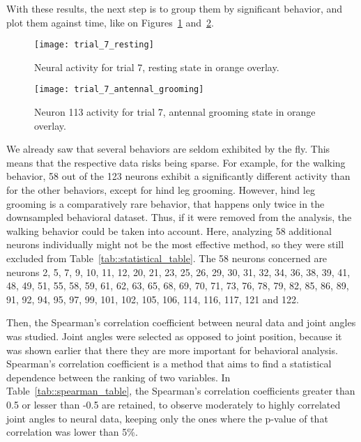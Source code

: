 With these results, the next step is to group them by significant behavior, and plot them against time, like on Figures~\ref{fig::trial_7_resting} and~\ref{fig::trial_7_antennal_grooming}.

\begin{figure}[htbp]
	\begin{center}
		\texttt{[image: trial\_7\_resting]}
	\end{center}
	\caption{Neural activity for trial 7, resting state in orange overlay.}
	\label{fig::trial_7_resting}
\end{figure}

\begin{figure}[htbp]
	\begin{center}
		\texttt{[image: trial\_7\_antennal\_grooming]}
	\end{center}
	\caption{Neuron 113 activity for trial 7, antennal grooming state in orange overlay.}
	\label{fig::trial_7_antennal_grooming}
\end{figure}

We already saw that several behaviors are seldom exhibited by the fly.
This means that the respective data risks being sparse.
For example, for the walking behavior, 58 out of the 123 neurons exhibit a significantly different activity than for the other behaviors, except for hind leg grooming.
However, hind leg grooming is a comparatively rare behavior, that happens only twice in the downsampled behavioral dataset.
Thus, if it were removed from the analysis, the walking behavior could be taken into account.
Here, analyzing 58 additional neurons individually might not be the most effective method, so they were still excluded from Table~\ref{tab::statistical_table}.
The 58 neurons concerned are neurons 2, 5, 7, 9, 10, 11, 12, 20, 21, 23, 25, 26, 29, 30, 31, 32, 34, 36, 38, 39, 41, 48, 49, 51, 55, 58, 59, 61, 62, 63, 65, 68, 69, 70, 71, 73, 76, 78, 79, 82, 85, 86, 89, 91, 92, 94, 95, 97, 99, 101, 102, 105, 106, 114, 116, 117, 121 and 122.

\vspace{\baselineskip}

Then, the Spearman's correlation coefficient between neural data and joint angles was studied.
Joint angles were selected as opposed to joint position, because it was shown earlier that there they are more important for behavioral analysis.
Spearman's correlation coefficient is a method that aims to find a statistical dependence between the ranking of two variables.
In Table~\ref{tab::spearman_table}, the Spearman's correlation coefficients greater than 0.5 or lesser than -0.5 are retained, to observe moderately to highly correlated joint angles to neural data, keeping only the ones where the p-value of that correlation was lower than 5\%.

